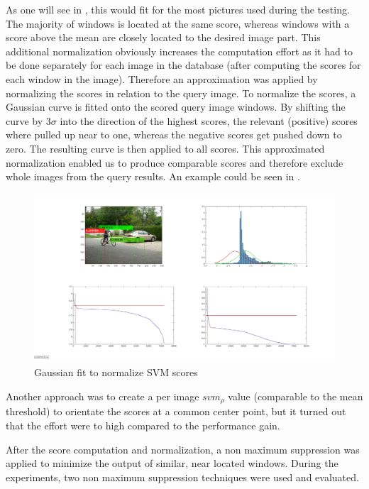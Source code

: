As one will see in , this would fit for the most pictures used during the testing. The majority of windows is located at the same score, whereas windows with a score above the mean are closely located to the desired image part.
This additional normalization obviously increases the computation effort as it had to be done separately for each image in the database (after computing the scores for each window in the image). Therefore an approximation was applied by normalizing the scores in relation to the query image. To normalize the scores, a Gaussian curve is fitted onto the scored query image windows. By shifting the curve by $3\sigma$ into the direction of the highest scores, the relevant (positive) scores where pulled up near to one, whereas the negative scores get pushed down to zero. The resulting curve is then applied to all scores. This approximated normalization enabled us to produce comparable scores and therefore exclude whole images from the query results. An example could be seen in .

\begin{figure}
\centering
\includegraphics[width=\linewidth]{images/score_gauss_fit}
\caption{Gaussian fit to normalize \ac{SVM} scores}
\label{fig:score_gauss_fit}
\end{figure}


Another approach was to create a per image $svm_\rho$ value (comparable to the mean threshold) to orientate the scores at a common center point, but it turned out that the effort were to high compared to the performance gain.

After the score computation and normalization, a non maximum suppression was applied to minimize the output of similar, near located windows.
During the experiments, two non maximum suppression techniques were used and evaluated.

